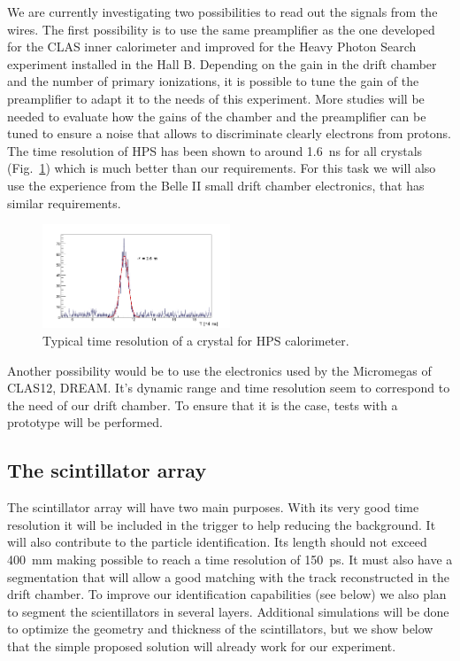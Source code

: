 We are currently investigating two possibilities to read out the signals from the wires.
The first possibility is to use the same preamplifier as the one developed for the CLAS inner calorimeter and improved for the Heavy Photon Search \cite{HPS} experiment installed in the Hall B. Depending on the gain in the drift chamber and the number of primary ionizations, it is possible to tune the gain of the preamplifier to adapt it to the needs of this experiment. More studies will be needed to evaluate how the gains of the chamber and the preamplifier can be tuned to ensure a noise that allows to discriminate clearly electrons from protons. The time resolution of HPS has been shown to around 1.6~ns for all crystals (Fig.~\ref{fig:HPSTreso}) which is much better than our requirements. For this task we will also use the experience from the Belle II small drift chamber electronics, that has similar requirements.

\begin{figure}
  \begin{center}
    \includegraphics[angle=0, width=0.5\textwidth]{./../Detector/fig-chap2/timing_fit_gauss_3pol}
    \caption{Typical time resolution of a crystal for HPS calorimeter.}
    \label{fig:HPSTreso}
  \end{center}
\end{figure}

Another possibility would be to use the electronics used by the Micromegas of CLAS12, DREAM. It's dynamic range and time resolution seem to correspond to the need of our drift chamber. To ensure that it is the case, tests with a prototype will be performed.

\subsection{The scintillator array}

The scintillator array will have two main purposes. With its very good time resolution it will be included in the trigger to help reducing the background. It will also contribute to the particle identification. Its length should not exceed 400~mm making possible to reach a time resolution of 150~ps. It must also have a segmentation that will allow a good matching with the track reconstructed in the drift chamber. To improve our identification capabilities (see below) we also plan to segment the scientillators in several layers. Additional simulations will be done to optimize the geometry and thickness of the scintillators, but we show below that the simple proposed solution will already work for our experiment.

